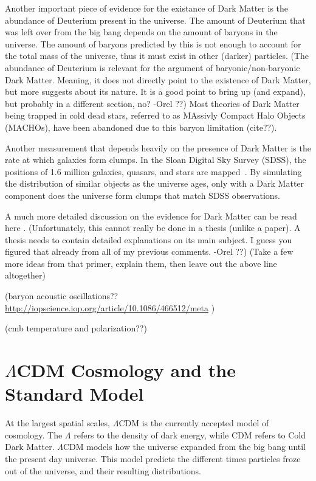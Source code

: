     Another important piece of evidence for the existance of Dark Matter is the abundance of Deuterium present in the universe.
    The amount of Deuterium that was left over from the big bang depends on the amount of baryons in the universe.
    The amount of baryons predicted by this is not enough to account for the total mass of the universe, thus it must exist in other (darker) particles.
    {\color{red}(The abundance of Deuterium is relevant for the argument of baryonic/non-baryonic Dark Matter. Meaning, it does not directly point to the existence of Dark Matter, but more suggests about its nature. It is a good point to bring up (and expand), but probably in a different section, no? -Orel ??)}
    Most theories of Dark Matter being trapped in cold dead stars, referred to as MAssivly Compact Halo Objects (MACHOs), have been abandoned due to this baryon limitation {\color{red}(cite??)}.

    Another measurement that depends heavily on the presence of Dark Matter is the rate at which galaxies form clumps.
    In the Sloan Digital Sky Survey (SDSS), the positions of 1.6 million galaxies, quasars, and stars are mapped~\cite{sdss_release}.
    By simulating the distribution of similar objects as the universe ages, only with a Dark Matter component does the universe form clumps that match SDSS observations.
  
    A much more detailed discussion on the evidence for Dark Matter can be read here \cite{DMPrimer}.
    {\color{red}(Unfortunately, this cannot really be done in a thesis (unlike a paper). A thesis needs to contain detailed explanations on its main subject. I guess you figured that already from all of my previous comments. -Orel ??)}
    {\color{red}(Take a few more ideas from that primer, explain them, then leave out the above line altogether)}

    {\color{red}(baryon acoustic oscillations?? \url{http://iopscience.iop.org/article/10.1086/466512/meta} )}
    
    
    {\color{red}(cmb temperature and polarization??)}
    

\section{$\Lambda$CDM Cosmology and the Standard Model}

  At the largest spatial scales, $\Lambda$CDM is the currently accepted model of cosmology.
  The $\Lambda$ refers to the density of dark energy, while CDM refers to Cold Dark Matter.
  $\Lambda$CDM models how the universe expanded from the big bang until the present day universe.
  This model predicts the different times particles froze out of the universe, and their resulting distributions.


